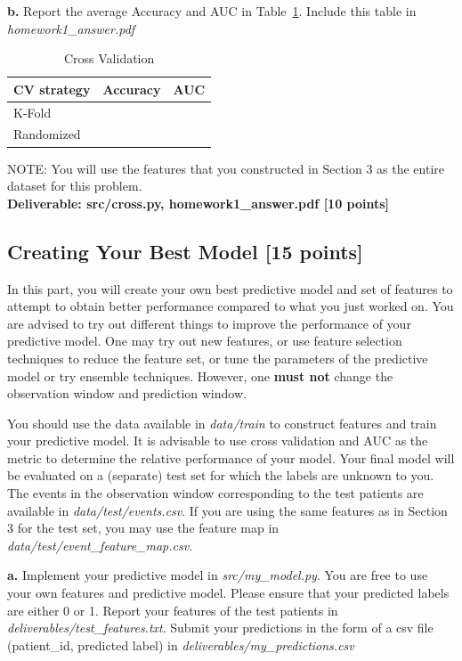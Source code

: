 \documentclass[12pt]{article}
\begin{document}
\textbf{b.} Report the average Accuracy and AUC in Table~\ref{tbl:cv}. Include this table in \textit{homework1\_answer.pdf}\\
\begin{table}[h]
\centering
\begin{tabular}{@{}lcc@{}}
\toprule
CV strategy & Accuracy & AUC  \\ \midrule
K-Fold & & \\
Randomized & & \\
\bottomrule
\end{tabular}
\caption{Cross Validation}
\label{tbl:cv}
\end{table} 

NOTE: You will use the features that you constructed in Section 3 as the entire dataset for this problem. \\

\textbf{Deliverable: src/cross.py, homework1\_answer.pdf [10 points]}

\subsection{Creating Your Best Model [15 points]}
In this part, you will create your own best predictive model and set of features to attempt to obtain better performance compared to what you just worked on. You are advised to try out different things to improve the performance of your predictive model. One may try out new features, or use feature selection techniques to reduce the feature set, or tune the parameters of the predictive model or try ensemble techniques. However, one \textbf{must not} change the observation window and prediction window. 

You should use the data available in \textit{data/train} to construct features and train your predictive model. It is advisable to use cross validation and AUC as the metric to determine the relative performance of your model. Your final model will be evaluated on a (separate) test set for which the labels are unknown to you. The events in the observation window corresponding to the test patients are available in \textit{data/test/events.csv}. If you are using the same features as in Section 3 for the test set, you may use the feature map in \textit{data/test/event\_feature\_map.csv}. 
 
\textbf{a.} Implement your predictive model in \textit{src/my\_model.py}. You are free to use your own features and predictive model. Please ensure that your predicted labels are either 0 or 1. Report your features of the test patients in \textit{deliverables/test\_features.txt}. Submit your predictions in the form of a csv file (patient\_id, predicted label) in  \textit{deliverables/my\_predictions.csv}
\end{document}
